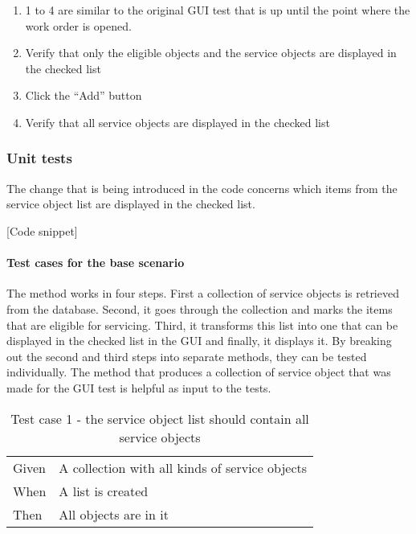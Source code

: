 \documentclass{article}
\begin{document}
				\begin{enumerate}
					\item 1 to 4 are similar to the original GUI test that is up until the point where the work order is opened.
					\setcounter{enumi}{4}
					\item Verify that only the eligible objects and the service objects are displayed in the checked list
					\item Click the “Add” button
					\item Verify that all service objects are displayed in the checked list
				\end{enumerate}

			\subsubsection{Unit tests}
				The change that is being introduced in the code concerns which items from the service object list are displayed in the checked list.

				[Code snippet]
				
				\paragraph{Test cases for the base scenario} 
				The method works in four steps. First a collection of service objects is retrieved from the database.
				Second, it goes through the collection and marks the items that are eligible for servicing. Third, it transforms this list into one that can be displayed in the checked list in the GUI and finally, it displays it.
				By breaking out the second and third steps into separate methods, they can be tested individually.
				The method that produces a collection of service object that was made for the GUI test is helpful as input to the tests.

				\begin{table}[h!]
					\centering
					\begin{tabular}{|p{1cm} p{7cm} |}
					\hline
					Given 	& A collection with all kinds of service objects \\ 
					When 	& A list is created  \\	
					Then 	& All objects are in it \\
					\hline
					\end{tabular}
					\caption{Test case 1 - the service object list should contain all service objects}
				\end{table}
\end{document}
